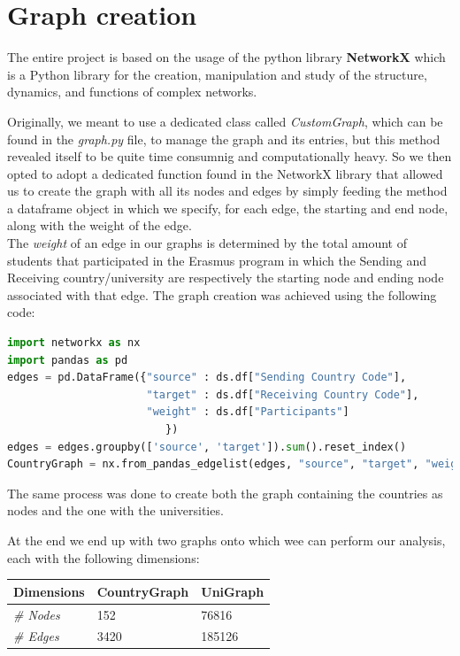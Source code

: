 \section{Graph creation}
The entire project is based on the usage of the python library \textbf{NetworkX} which is a Python library for the creation, manipulation and study of the structure, dynamics, and functions of complex networks.

Originally, we meant to use a dedicated class called \textit{CustomGraph}, which can be found in the \textit{graph.py} file, to manage the graph
and its entries, but this method revealed itself to be quite time consumnig and computationally heavy. So we then opted to adopt a 
dedicated function found in the NetworkX library that allowed us to create the graph with all its nodes and edges by simply feeding the method 
a dataframe object in which we specify, for each edge, the starting and end node, along with the weight of the edge. 
\\
The \textit{weight} of an edge in our graphs is determined by the total amount of students that participated in the Erasmus program in which the Sending and Receiving 
country/university are respectively the starting node and ending node associated with that edge.
The graph creation was achieved using the following code:
\begin{lstlisting}[caption={Country Graph creation}, language=python]
import networkx as nx
import pandas as pd
edges = pd.DataFrame({"source" : ds.df["Sending Country Code"],
                      "target" : ds.df["Receiving Country Code"],
                      "weight" : ds.df["Participants"]
                         })
edges = edges.groupby(['source', 'target']).sum().reset_index()
CountryGraph = nx.from_pandas_edgelist(edges, "source", "target", "weight", nx.DiGraph())
\end{lstlisting}
The same process was done to create both the graph containing the countries as nodes and the one with the universities.

At the end we end up with two graphs onto which wee can perform our analysis, each with the following dimensions:

\begin{table}[!ht]
  \centering
  \begin{tabular}{l|ll}
  \rowcolor[HTML]{FFFFFF} 
  \textbf{Dimensions} & \textbf{CountryGraph} & \textbf{UniGraph} \\ \hline
  \textit{\# Nodes}   & 152                   & 76816             \\
  \textit{\# Edges}   & 3420                  & 185126           
  \end{tabular}
  \end{table}


